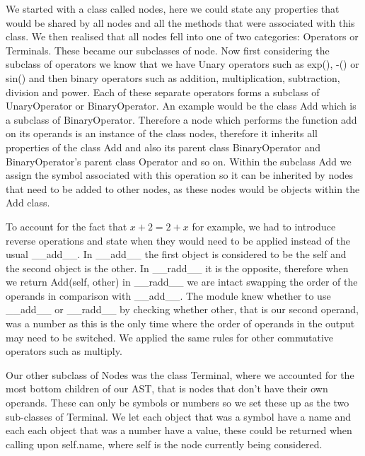 \documentclass[12pt]{article}
\begin{document}
We started with a class called nodes, here we could state any properties that would be shared by all nodes and all the methods that were associated with this class. We then realised that all nodes fell into one of two categories: Operators or Terminals. These became our subclasses of node. Now first considering the subclass of operators we know that we have Unary operators such as exp(), -() or sin() and then binary operators such as addition, multiplication, subtraction, division and power. Each of these separate operators forms a subclass of UnaryOperator or BinaryOperator. An example would be the class Add which is a subclass of BinaryOperator. Therefore a node which performs the function add on its operands is an instance of the class nodes, therefore it inherits all properties of the class Add and also its parent class BinaryOperator and BinaryOperator’s parent class Operator and so on. Within the subclass Add we assign the symbol associated with this operation so it can be inherited by nodes that need to be added to other nodes, as these nodes would be objects within the Add class.

To account for the fact that $x + 2 = 2 + x$ for example, we had to introduce reverse operations and state when they would need to be applied instead of the usual \_\_add\_\_. In \_\_add\_\_ the first object is considered to be the self and the second object is the other. In \_\_radd\_\_ it is the opposite, therefore when we return Add(self, other) in \_\_radd\_\_ we are intact swapping the order of the operands in comparison with \_\_add\_\_. The module knew whether to use \_\_add\_\_ or \_\_radd\_\_ by checking whether other, that is our second operand, was a number as this is the only time where the order of operands in the output may need to be switched. We applied the same rules for other commutative operators such as multiply. 

Our other subclass of Nodes was the class Terminal, where we accounted for the most bottom children of our AST, that is nodes that don’t have their own operands. These can only be symbols or numbers so we set these up as the two sub-classes of Terminal. We let each object that was a symbol have a name and each each object that was a number have a value, these could be returned when calling upon self.name, where self is the node currently being considered. 
\end{document}

